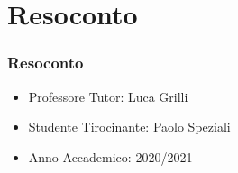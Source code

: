 \documentclass{beamer}
\begin{document}
\section{Resoconto}
\begin{frame}
	\frametitle{Resoconto}
	\begin{itemize}
  		\item Professore Tutor: Luca Grilli
  		\item Studente Tirocinante: Paolo Speziali
  		\item Anno Accademico: 2020/2021
	\end{itemize}
\end{frame}
\end{document}
